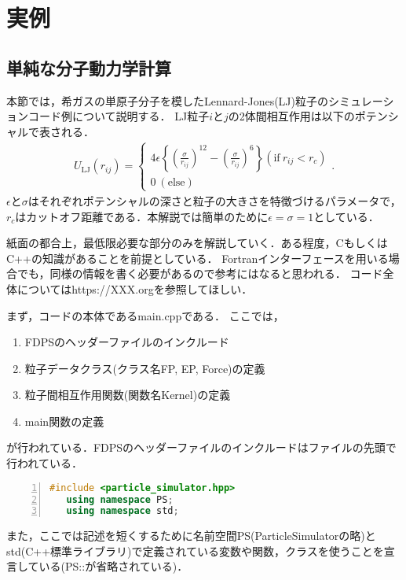 \documentclass[twocolumn,10pt]{jarticle}
\begin{document}
 
 
\section{実例}%
\subsection{単純な分子動力学計算}
本節では，希ガスの単原子分子を模したLennard-Jones(LJ)粒子のシミュレーションコード例について説明する．
LJ粒子$i$と$j$の2体間相互作用は以下のポテンシャルで表される．
\begin{eqnarray}
 U_{\mathrm{LJ}}(r_{ij}) = \begin{cases}
	   4\epsilon\left\{\left(\frac{\sigma}{r_{ij}}\right)^{12} - \left(\frac{\sigma}{r_{ij}}\right)^{6}\right\} (\mathrm{if}\ r_{ij} < r_c)\\
	   0\ (\mathrm{else})
	  \end{cases}.
\end{eqnarray}
$\epsilon$と$\sigma$はそれぞれポテンシャルの深さと粒子の大きさを特徴づけるパラメータで，$r_c$はカットオフ距離である．本解説では簡単のために$\epsilon = \sigma = 1$としている．

紙面の都合上，最低限必要な部分のみを解説していく．ある程度，CもしくはC++の知識があることを前提としている．
Fortranインターフェースを用いる場合でも，同様の情報を書く必要があるので参考にはなると思われる．
コード全体についてはhttps://XXX.orgを参照してほしい．

まず，コードの本体であるmain.cppである．
ここでは，
 \begin{enumerate}
 \item FDPSのヘッダーファイルのインクルード
 \item 粒子データクラス(クラス名FP, EP, Force)の定義
 \item 粒子間相互作用関数(関数名Kernel)の定義
 \item main関数の定義
 \end{enumerate}
 が行われている．FDPSのヘッダーファイルのインクルードはファイルの先頭で行われている．
  \begin{lstlisting}[language=c++,numbers=left,numbersep=5pt,frame=single,basicstyle=\ttfamily]
   #include <particle_simulator.hpp>
   using namespace PS;
   using namespace std;
  \end{lstlisting}
  また，ここでは記述を短くするために名前空間PS(ParticleSimulatorの略)とstd(C++標準ライブラリ)で定義されている変数や関数，クラスを使うことを宣言している(PS::が省略されている)．
\end{document}
